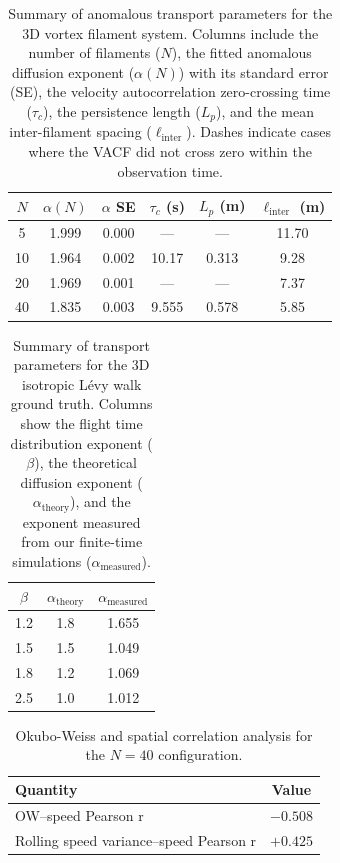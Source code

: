 \documentclass[]{article}
\begin{document}
\begin{table}[h!]
\centering
\caption{Summary of anomalous transport parameters for the 3D vortex filament system. Columns include the number of filaments ($N$), the fitted anomalous diffusion exponent ($\alpha(N)$) with its standard error (SE), the velocity autocorrelation zero-crossing time ($\tau_c$), the persistence length ($L_p$), and the mean inter-filament spacing ($\ell_{\text{inter}}$). Dashes indicate cases where the VACF did not cross zero within the observation time.}
\label{tab:params_vortex}
\begin{tabular}{cccccc}
\hline
$N$ & $\alpha(N)$ & $\alpha$ SE & $\tau_c$ (s) & $L_p$ (m) & $\ell_{\text{inter}}$ (m) \\
\hline
5  & 1.999 & 0.000 & ---     & ---     & 11.70 \\
10 & 1.964 & 0.002 & 10.17 & 0.313 & 9.28  \\
20 & 1.969 & 0.001 & ---     & ---     & 7.37  \\
40 & 1.835 & 0.003 & 9.555 & 0.578 & 5.85  \\
\hline
\end{tabular}
\end{table}

\begin{table}[h!]
\centering
\caption{Summary of transport parameters for the 3D isotropic L\'evy walk ground truth. Columns show the flight time distribution exponent ($\beta$), the theoretical diffusion exponent ($\alpha_{\text{theory}}$), and the exponent measured from our finite-time simulations ($\alpha_{\text{measured}}$).}
\label{tab:params_levy}
\begin{tabular}{ccc}
\hline
$\beta$ & $\alpha_{\text{theory}}$ & $\alpha_{\text{measured}}$ \\
\hline
1.2 & 1.8 & 1.655 \\
1.5 & 1.5 & 1.049 \\
1.8 & 1.2 & 1.069 \\
2.5 & 1.0 & 1.012 \\
\hline
\end{tabular}
\end{table}

\begin{table}[h!]
\centering
\caption{Okubo-Weiss and spatial correlation analysis for the $N=40$ configuration.}
\label{tab:params_ow}
\begin{tabular}{lc}
\hline
Quantity & Value \\
\hline
OW--speed Pearson r & $-0.508$ \\
Rolling speed variance--speed Pearson r & $+0.425$ \\
\hline
\end{tabular}
\end{table}
\end{document}
